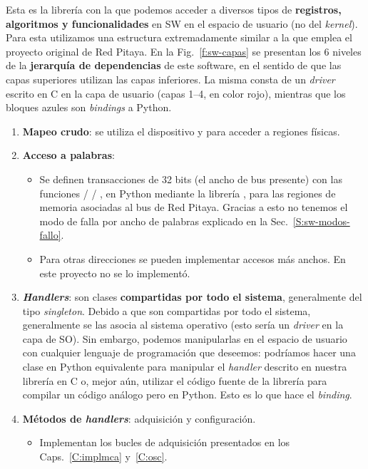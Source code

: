 Esta es la librería con la que podemos acceder a diversos tipos de
\textbf{registros, algoritmos y funcionalidades} en SW en el espacio de usuario
(no del \emph{kernel}). Para esta utilizamos una estructura extremadamente similar a la
que emplea el proyecto original de Red Pitaya. En la Fig.~\ref{f:sw-capas} se
presentan los 6 niveles de la \textbf{jerarquía de dependencias} de este
software, en el sentido de que las capas superiores utilizan las capas
inferiores. La misma consta de un \emph{driver} escrito en C en la capa de usuario
(capas 1--4, en color rojo), mientras que los bloques azules son
\emph{bindings} a Python.
\begin{enumerate}
  \item \textbf{Mapeo crudo}: se utiliza el dispositivo  y
     para acceder a regiones físicas.
  \item \textbf{Acceso a palabras}:
  \begin{itemize}
    \item Se definen transacciones de 32 bits (el ancho de bus presente) con las
      funciones  /  / , en Python
      mediante la librería , para las regiones de memoria
      asociadas al bus de Red Pitaya. Gracias a esto no tenemos el modo de falla por
      ancho de palabras explicado en la Sec.~\ref{S:sw-modos-fallo}.
    \item Para otras direcciones se pueden implementar accesos más anchos. En
      este proyecto no se lo implementó.
  \end{itemize}
  \item \textbf{\emph{Handlers}}: son clases \textbf{compartidas por todo el sistema},
    generalmente del tipo \emph{singleton}. Debido a que son compartidas por todo el
    sistema, generalmente se las asocia al sistema operativo (esto sería un
    \emph{driver} en la capa de SO). Sin embargo, podemos manipularlas en el espacio de
    usuario con cualquier lenguaje de programación que deseemos: podríamos hacer
    una clase en Python equivalente para manipular el \emph{handler} descrito en
    nuestra librería en C o, mejor aún, utilizar el código fuente de la
    librería para compilar un código análogo pero en Python. Esto es lo que hace
    el \emph{binding}.
  \item \textbf{Métodos de \emph{handlers}}: adquisición y configuración.
  \begin{itemize}
    \item Implementan los bucles de adquisición presentados en los Caps.~\ref{C:implmca} y~\ref{C:osc}.

\end{itemize}
\end{enumerate}
